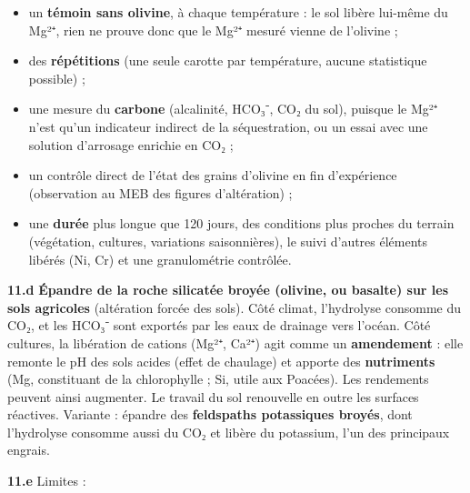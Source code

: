 \documentclass[11pt,a4paper]{article}
\providecommand{\tightlist}{\setlength{\itemsep}{0pt}\setlength{\parskip}{0pt}}
\begin{document}
\begin{itemize}
\tightlist
\item
  un \textbf{témoin sans olivine}, à chaque température : le sol libère lui-même du Mg²⁺, rien ne prouve donc que le Mg²⁺ mesuré vienne de l'olivine ;
\item
  des \textbf{répétitions} (une seule carotte par température, aucune statistique possible) ;
\item
  une mesure du \textbf{carbone} (alcalinité, HCO₃⁻, CO₂ du sol), puisque le Mg²⁺ n'est qu'un indicateur indirect de la séquestration, ou un essai avec une solution d'arrosage enrichie en CO₂ ;
\item
  un contrôle direct de l'état des grains d'olivine en fin d'expérience (observation au MEB des figures d'altération) ;
\item
  une \textbf{durée} plus longue que 120 jours, des conditions plus proches du terrain (végétation, cultures, variations saisonnières), le suivi d'autres éléments libérés (Ni, Cr) et une granulométrie contrôlée.
\end{itemize}

\textbf{11.d} \textbf{Épandre de la roche silicatée broyée (olivine, ou basalte) sur les sols agricoles} (altération forcée des sols). Côté climat, l'hydrolyse consomme du CO₂, et les HCO₃⁻ sont exportés par les eaux de drainage vers l'océan. Côté cultures, la libération de cations (Mg²⁺, Ca²⁺) agit comme un \textbf{amendement} : elle remonte le pH des sols acides (effet de chaulage) et apporte des \textbf{nutriments} (Mg, constituant de la chlorophylle ; Si, utile aux Poacées). Les rendements peuvent ainsi augmenter. Le travail du sol renouvelle en outre les surfaces réactives. Variante : épandre des \textbf{feldspaths potassiques broyés}, dont l'hydrolyse consomme aussi du CO₂ et libère du potassium, l'un des principaux engrais.

\textbf{11.e} Limites :
\end{document}
